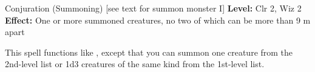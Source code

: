 {Conjuration (Summoning) [see text for summon monster I]}
{
	\textbf{Level:}
	Clr 2, Wiz 2\\
	\textbf{Effect:}
	One or more summoned creatures, no two of which can be more than 9 m apart\\
}
{
	This spell functions like , except that you can summon one creature from the 2nd-level list or 1d3 creatures of the same kind from the 1st-level list.

}
